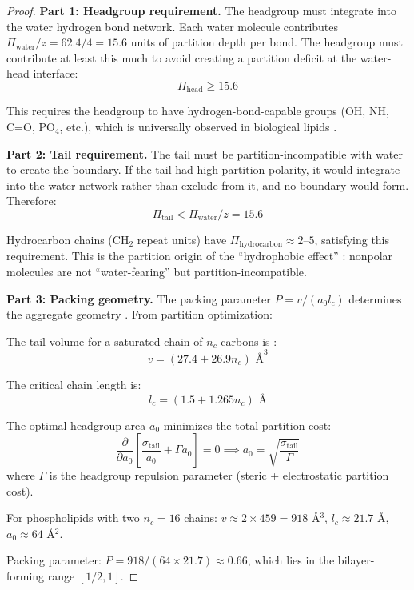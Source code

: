 \documentclass[twocolumn,10pt]{article}
\theoremstyle{remark}
\begin{document}
\begin{proof}
\textbf{Part 1: Headgroup requirement.}
The headgroup must integrate into the water hydrogen bond network. Each water molecule contributes $\Pi_{\text{water}}/z = 62.4/4 = 15.6$ units of partition depth per bond. The headgroup must contribute at least this much to avoid creating a partition deficit at the water-head interface:
\begin{equation}
    \Pi_{\text{head}} \geq 15.6
\end{equation}

This requires the headgroup to have hydrogen-bond-capable groups (OH, NH, C=O, PO$_4$, etc.), which is universally observed in biological lipids \cite{vance2008}.

\textbf{Part 2: Tail requirement.}
The tail must be partition-incompatible with water to create the boundary. If the tail had high partition polarity, it would integrate into the water network rather than exclude from it, and no boundary would form. Therefore:
\begin{equation}
    \Pi_{\text{tail}} < \Pi_{\text{water}}/z = 15.6
\end{equation}

Hydrocarbon chains (CH$_2$ repeat units) have $\Pi_{\text{hydrocarbon}} \approx 2$--$5$, satisfying this requirement. This is the partition origin of the ``hydrophobic effect'' \cite{tanford1980,chandler2005}: nonpolar molecules are not ``water-fearing'' but partition-incompatible.

\textbf{Part 3: Packing geometry.}
The packing parameter $P = v/(a_0 l_c)$ determines the aggregate geometry \cite{israelachvili1976}. From partition optimization:

The tail volume for a saturated chain of $n_c$ carbons is \cite{tanford1980}:
\begin{equation}
    v = (27.4 + 26.9 n_c) \text{ \AA}^3
\end{equation}

The critical chain length is:
\begin{equation}
    l_c = (1.5 + 1.265 n_c) \text{ \AA}
\end{equation}

The optimal headgroup area $a_0$ minimizes the total partition cost:
\begin{equation}
    \frac{\partial}{\partial a_0}\left[\frac{\sigma_{\text{tail}}}{a_0} + \Gamma a_0\right] = 0 \implies a_0 = \sqrt{\frac{\sigma_{\text{tail}}}{\Gamma}}
\end{equation}
where $\Gamma$ is the headgroup repulsion parameter (steric + electrostatic partition cost).

For phospholipids with two $n_c = 16$ chains: $v \approx 2 \times 459 = 918$ \AA$^3$, $l_c \approx 21.7$ \AA, $a_0 \approx 64$ \AA$^2$.

Packing parameter: $P = 918/(64 \times 21.7) \approx 0.66$, which lies in the bilayer-forming range $[1/2, 1]$.
\end{proof}
\end{document}
